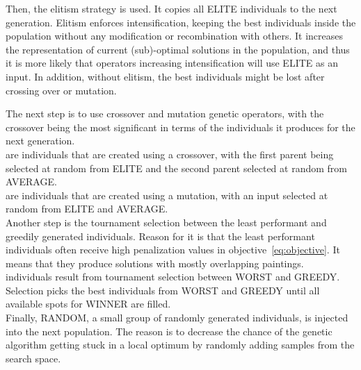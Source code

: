 Then, the elitism strategy is used.
It copies all ELITE individuals to the next generation.
Elitism enforces intensification, keeping the best individuals inside the population without any
modification or recombination with others.
It increases the representation of current (sub)-optimal solutions in the population, and thus it is
more likely that operators increasing intensification will use ELITE as an input.
In addition, without elitism, the best individuals might be lost after crossing over or mutation.

The next step is to use crossover and mutation genetic operators, with the crossover being
the most significant in terms of the individuals it produces for the next generation.\\

 are individuals that are created using a crossover, with the first parent being selected
at random from ELITE and the second parent selected at random from AVERAGE.\\

 are individuals that are created using a mutation,
with an input selected at random from ELITE and AVERAGE.\\

Another step is the tournament selection between the least performant and greedily generated individuals.
Reason for it is that the least performant individuals often receive high penalization
values in objective~\ref{eq:objective}.
It means that they produce solutions with mostly overlapping paintings.
\\

 individuals result from tournament selection between WORST and GREEDY.
Selection picks the best individuals from WORST and GREEDY until all available spots for WINNER are filled. \\

Finally, RANDOM, a small group of randomly generated individuals, is injected into the next population.
The reason is to decrease the chance of the genetic algorithm getting stuck in a local optimum
by randomly adding samples from the search space.
